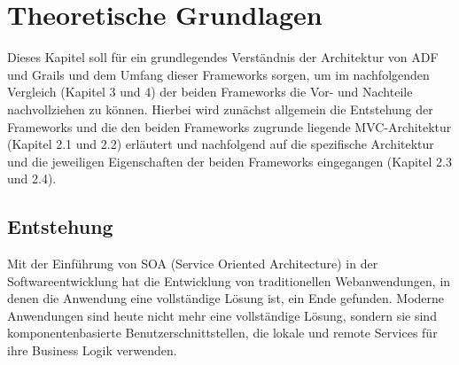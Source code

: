 \section{Theoretische Grundlagen}
Dieses Kapitel soll für ein grundlegendes Verständnis der Architektur von ADF und Grails und dem Umfang dieser Frameworks sorgen, um im nachfolgenden Vergleich (Kapitel 3 und 4) der beiden Frameworks die Vor- und Nachteile nachvollziehen zu können. Hierbei wird zunächst allgemein die Entstehung der Frameworks und die den beiden Frameworks zugrunde liegende MVC-Architektur (Kapitel 2.1 und 2.2) erläutert und nachfolgend auf die spezifische Architektur und die jeweiligen Eigenschaften der beiden Frameworks eingegangen (Kapitel 2.3 und 2.4).

\subsection{Entstehung}
Mit der Einführung von SOA (Service Oriented Architecture) in der Softwareentwicklung hat die Entwicklung von traditionellen Webanwendungen, in denen die Anwendung eine vollständige Lösung ist, ein Ende gefunden. Moderne Anwendungen sind heute nicht mehr eine vollständige Lösung, sondern sie sind komponentenbasierte Benutzerschnittstellen, die lokale und remote Services für ihre Business Logik verwenden. \citep[S. XXI]{OFDG2010}
